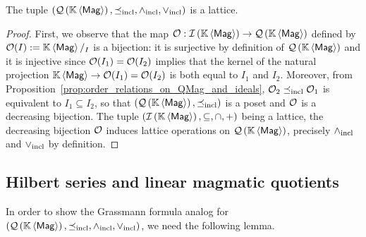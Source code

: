 \begin{Theorem} \label{thm:lattice_structure_of_QMag}
  The tuple $\LatQMag$ is a lattice.
\end{Theorem}
\begin{proof}
  First, we observe that the map $\Oca:\IMag\to\QMag$ defined by
  $\Oca(I) :=\KMag/_I$ is a bijection: it is surjective by definition of
  $\QMag$ and it is injective since $\Oca(I_1)=\Oca(I_2)$ implies that
  the kernel of the natural projection $\KMag\to\Oca(I_1)=\Oca(I_2)$ is
  both equal to $I_1$ and $I_2$. Moreover, from
  Proposition~\ref{prop:order_relations_on_QMag_and_ideals},
  $\Oca_2\OrdQMag\Oca_1$ is equivalent to $I_1\subseteq I_2$, so that
  $\left(\QMag,\OrdQMag\right)$ is a poset and $\Oca$ is a decreasing
  bijection. The tuple $\left(\IMag,\subseteq,\cap,+\right)$ being a
  lattice, the decreasing bijection $\Oca$ induces lattice operations on
  $\QMag$, precisely $\InfQMag$ and $\SupQMag$ by definition.
\end{proof}
\medbreak

\subsection{Hilbert series and linear magmatic quotients}
In order to show the Grassmann formula analog for $\LatQMag$, we need the
following lemma.
\medbreak

